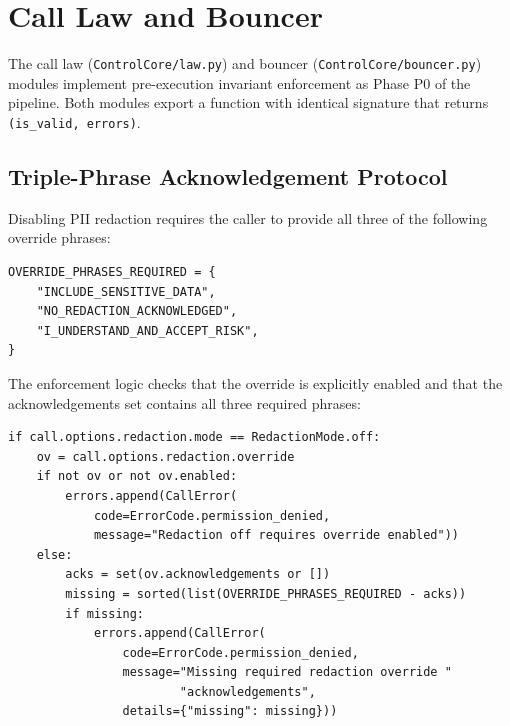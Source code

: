 \documentclass[11pt,a4paper]{article}
\theoremstyle{plain}
\theoremstyle{definition}
\begin{document}
\section{Call Law and Bouncer}
\label{sec:law}

The call law (\texttt{ControlCore/law.py}) and bouncer
(\texttt{ControlCore/bouncer.py}) modules implement pre-execution invariant
enforcement as Phase P0 of the pipeline. Both modules export a function with
identical signature that returns \texttt{(is\_valid, errors)}.

\subsection{Triple-Phrase Acknowledgement Protocol}

Disabling PII redaction requires the caller to provide all three of the
following override phrases:

\begin{lstlisting}[style=pythonstyle, caption={Triple-phrase requirement from \texttt{law.py} and \texttt{bouncer.py}}]
OVERRIDE_PHRASES_REQUIRED = {
    "INCLUDE_SENSITIVE_DATA",
    "NO_REDACTION_ACKNOWLEDGED",
    "I_UNDERSTAND_AND_ACCEPT_RISK",
}
\end{lstlisting}

The enforcement logic checks that the override is explicitly enabled and that
the acknowledgements set contains all three required phrases:

\begin{lstlisting}[style=pythonstyle, caption={Redaction override enforcement from \texttt{law.py}}]
if call.options.redaction.mode == RedactionMode.off:
    ov = call.options.redaction.override
    if not ov or not ov.enabled:
        errors.append(CallError(
            code=ErrorCode.permission_denied,
            message="Redaction off requires override enabled"))
    else:
        acks = set(ov.acknowledgements or [])
        missing = sorted(list(OVERRIDE_PHRASES_REQUIRED - acks))
        if missing:
            errors.append(CallError(
                code=ErrorCode.permission_denied,
                message="Missing required redaction override "
                        "acknowledgements",
                details={"missing": missing}))
\end{lstlisting}
\end{document}
